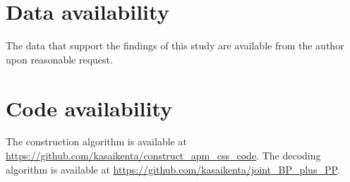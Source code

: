 \documentclass[a4paper,onecolumn,11pt,accepted=2026-08-03]{quantumarticle}
\renewcommand\[{\begin{equation}}
\renewcommand\]{\end{equation}}
\theoremstyle{definition}
\begin{document}
\section*{Data availability}
The data that support the findings of this study are available from the author upon reasonable request.

\section*{Code availability}
\begin{sloppypar}
The construction algorithm is available at \url{https://github.com/kasaikenta/construct_apm_css_code}.
The decoding algorithm is available at \url{https://github.com/kasaikenta/joint_BP_plus_PP}.
\end{sloppypar}
 

\end{document}
